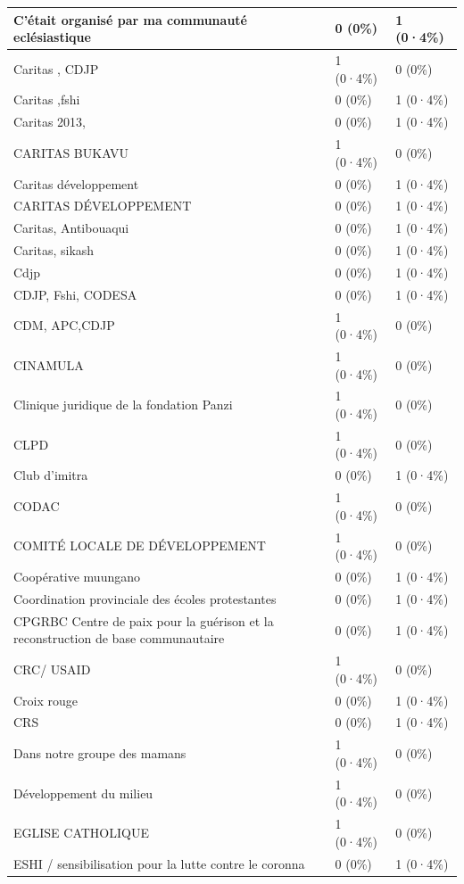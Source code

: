 \documentclass[
]{book}
\begin{document}
\begin{tabular}{l|l|l}
\hline
C'était organisé par ma communauté eclésiastique & 0 (0\%) & 1 (0·4\%)\\
\hline
Caritas , CDJP & 1 (0·4\%) & 0 (0\%)\\
\hline
Caritas ,fshi & 0 (0\%) & 1 (0·4\%)\\
\hline
Caritas 2013, & 0 (0\%) & 1 (0·4\%)\\
\hline
CARITAS BUKAVU & 1 (0·4\%) & 0 (0\%)\\
\hline
Caritas développement & 0 (0\%) & 1 (0·4\%)\\
\hline
CARITAS DÉVELOPPEMENT & 0 (0\%) & 1 (0·4\%)\\
\hline
Caritas, Antibouaqui & 0 (0\%) & 1 (0·4\%)\\
\hline
Caritas, sikash & 0 (0\%) & 1 (0·4\%)\\
\hline
Cdjp & 0 (0\%) & 1 (0·4\%)\\
\hline
CDJP, Fshi, CODESA & 0 (0\%) & 1 (0·4\%)\\
\hline
CDM, APC,CDJP & 1 (0·4\%) & 0 (0\%)\\
\hline
CINAMULA & 1 (0·4\%) & 0 (0\%)\\
\hline
Clinique juridique de la fondation Panzi & 1 (0·4\%) & 0 (0\%)\\
\hline
CLPD & 1 (0·4\%) & 0 (0\%)\\
\hline
Club d'imitra & 0 (0\%) & 1 (0·4\%)\\
\hline
CODAC & 1 (0·4\%) & 0 (0\%)\\
\hline
COMITÉ LOCALE DE DÉVELOPPEMENT & 1 (0·4\%) & 0 (0\%)\\
\hline
Coopérative muungano & 0 (0\%) & 1 (0·4\%)\\
\hline
Coordination provinciale des écoles protestantes & 0 (0\%) & 1 (0·4\%)\\
\hline
CPGRBC Centre de paix pour la guérison et la reconstruction de base communautaire & 0 (0\%) & 1 (0·4\%)\\
\hline
CRC/ USAID & 1 (0·4\%) & 0 (0\%)\\
\hline
Croix rouge & 0 (0\%) & 1 (0·4\%)\\
\hline
CRS & 0 (0\%) & 1 (0·4\%)\\
\hline
Dans notre groupe des mamans & 1 (0·4\%) & 0 (0\%)\\
\hline
Développement du milieu & 1 (0·4\%) & 0 (0\%)\\
\hline
EGLISE CATHOLIQUE & 1 (0·4\%) & 0 (0\%)\\
\hline
ESHI / sensibilisation pour la lutte contre le coronna & 0 (0\%) & 1 (0·4\%)\\

\end{tabular}
\end{document}
